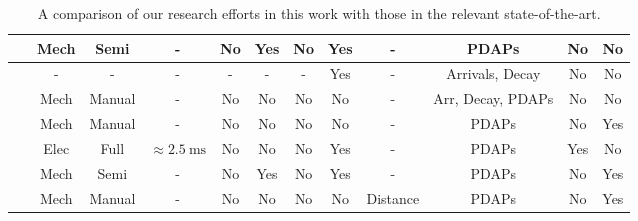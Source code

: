 \documentclass[12pt, draftcls, onecolumn]{IEEEtran}
\begin{document}
\begin{table}
\begin{tabular}{|*{12}{c|}}
    \hline
   ~\cite{PDAPs} & Mech & Semi & - & No & Yes & No & Yes & - & PDAPs & No & No\\
    \hline
   ~\cite{Indoor60G} & - & - & - & - & - & - & Yes & - & Arrivals, Decay & No & No\\
    \hline
   ~\cite{QDC_NIST} & Mech & Manual & - & No & No & No & No & - & Arr, Decay, PDAPs & No & No\\
    \hline
   ~\cite{D2DHumanBlockage} & Mech & Manual & - & No & No & No & No & - & PDAPs & No & Yes\\
    \hline
   ~\cite{DopplerHST} & Elec & Full & ${\approx}\SI{2.5}{\milli\second}$ & No & No & No & Yes & - & PDAPs & Yes & No\\
    \hline
   ~\cite{V2XBlockages} & Mech & Semi & - & No & Yes & No & Yes & - & PDAPs & No & Yes\\
    \hline
   ~\cite{MacCartneyUrbanHumanBlockage} & Mech & Manual & - & No & No & No & No & Distance & PDAPs & No & Yes\\
    \hline
    \end{tabular}
    \vspace{-1mm}
    \caption{A comparison of our research efforts in this work with those in the relevant state-of-the-art.}
    \label{T2}
\end{table}
\end{document}
